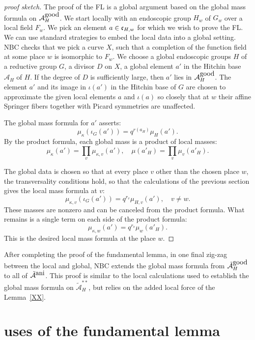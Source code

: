 \documentclass[brochure,english,12pt]{bourbaki}
\def\a{{\hbox{ani}}}
\def\c{\frak{c}}
\def\A{{\mathcal A}}
\def\tA{{\tilde{\mathcal A}}}
\begin{document}
\begin{proof}[proof sketch]
The proof of the FL is a global argument based on the global mass formula
on $\A_H^{\hbox{good}}$.  We start locally
with an endoscopic group $H_w$ of $G_w$ over a local field $F_w$.  We
pick an element $a\in \c_{H,w}$ for which we wish to prove the FL.  We can use standard
strategies to embed the local data into a global setting.  NBC checks
that we pick a curve $X$, such that a completion of the function field
at some place $w$ is isomorphic to $F_w$.  We choose a global
endoscopic groups $H$ of a reductive group $G$, a divisor $D$ on $X$,
a global element $a'$ in the Hitchin base $\A_H$ of $H$.  If the
degree of $D$ is sufficiently large, then $a'$ lies in
$\A_H^{\hbox{good}}$.  The element $a'$ and its image in $\iota(a')$ in the Hitchin base of $G$ are
chosen to approximate the given local elements $a$ and $\iota(a)$ so
closely that at $w$ their affine Springer fibers together with Picard symmetries
are unaffected.

The global mass formula for $a'$ asserts:
\[
\mu_\kappa(\iota_G(a')) = q^{r(a_H)} \mu_H(a').
\]
 By the product formula,
each global mass is a product of local masses:  
\[
\mu_\kappa(a') = \prod_v \mu_{\kappa,v}(a'),\quad
\mu(a'_H) = \prod_v\mu_{v}(a'_H).
\]

The global data is chosen so that at every
place $v$ other than the chosen place $w$, the transversality conditions hold, so that
the calculations of the previous section gives the local mass formula at $v$:
\[
\mu_{\kappa,v}(\iota_G(a')) = q^{r_v}\mu_{H,v}(a'),\quad v\ne w.
\]  
These masses are nonzero and  can be canceled from
the product formula.  What remains is a single term on each side of the product formula:
\[
\mu_{\kappa,w}(a') = q^{r_v}\mu_{w}(a'_H).
\]
This is the desired local mass formula at the place $w$.
\end{proof}

After completing the proof of the fundamental lemma,
in one final zig-zag between the local and global, NBC extends the global mass formula
from $\tA_H^{\hbox{good}}$ to all of $\tA^{\a}$.  This proof is similar to the local calculations
used to establish the global mass formula on $\tA_H^{**}$, but relies on the  added local
force of the Lemma~\ref{XX}.


\section{uses of the fundamental lemma}  
\end{document}
